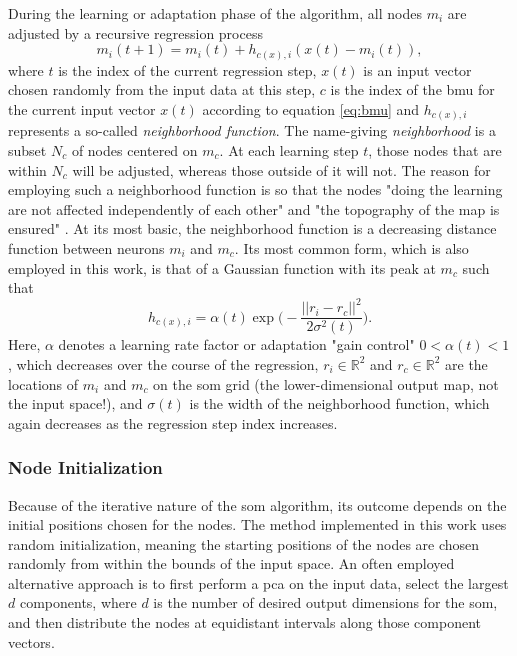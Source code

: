 During the learning or adaptation phase of the algorithm, all nodes $m_i$ are
adjusted by a recursive regression process
\begin{equation}
  \label{eq:node_update}
  m_i(t+1) = m_i(t) + h_{c(x),i}(x(t) - m_i(t)),
\end{equation}
where $t$ is the index of the current regression step, $x(t)$ is an input vector
chosen randomly from the input data at this step, $c$ is the index of the
\gls{bmu} for the current input vector $x(t)$ according to equation \ref{eq:bmu}
and $h_{c(x),i}$ represents a so-called \textit{neighborhood function}. The
name-giving \textit{neighborhood} is a subset $N_c$ of nodes centered on $m_c$.
At each learning step $t$, those nodes that are within $N_c$ will be adjusted,
whereas those outside of it will not. The reason for employing such a
neighborhood function is so that the nodes "doing the learning are not affected
independently of each other" \citep[p.1467]{kohonen1990} and "the topography of
the map is ensured" \citep[p.5]{bauer1996}. At its most basic, the
neighborhood function is a decreasing distance function between neurons $m_i$
and $m_c$. Its most common form, which is also employed in this work, is that of
a Gaussian function with its peak at $m_c$ such that
\begin{equation}
  h_{c(x),i} = \alpha(t) \exp\bigg(- \frac{||r_i - r_c||^2}{2\sigma^2(t)}\bigg).
\end{equation}
Here, $\alpha$ denotes a learning rate factor or adaptation "gain control"
$0 < \alpha(t) < 1$, which decreases over the course of the regression,
$r_i \in \mathbb{R}^2$ and $r_c \in \mathbb{R}^2$ are the locations of $m_i$ and
$m_c$ on the \gls{som} grid (the lower-dimensional output map, not the input
space!), and $\sigma(t)$ is the width of the neighborhood function, which again
decreases as the regression step index increases.
\bigskip


\subsubsection{Node Initialization}
\label{subsubsec:som_initialization}
Because of the iterative nature of the \gls{som} algorithm, its outcome depends
on the initial positions chosen for the nodes. The method implemented in this
work uses random initialization, meaning the starting positions of the nodes are
chosen randomly from within the bounds of the input space. An often employed
alternative approach is to first perform a \gls{pca} on the input data, select
the largest $d$ components, where $d$ is the number of desired output dimensions
for the \gls{som}, and then distribute the nodes at equidistant intervals along
those component vectors.

